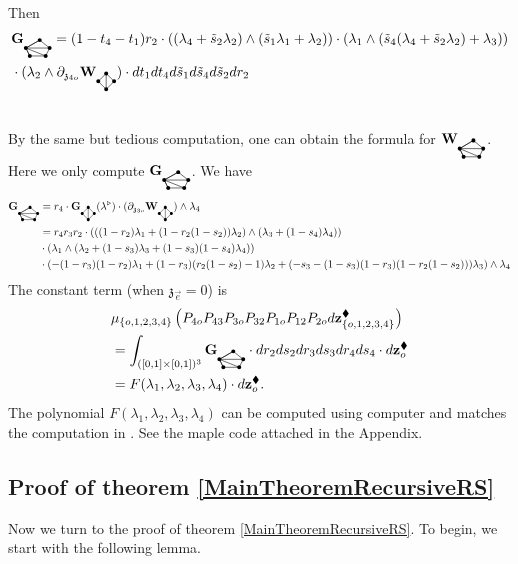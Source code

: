 \documentclass[11pt]{amsart}
\newcommand{\bgraphG}{
  \mathbf{G}_{\tikz[baseline=-0.5ex]{
      \coordinate (A) at (0,0);
      \coordinate (B) at (4mm,0);
      \coordinate (C) at (5mm,2mm);
      \coordinate (D) at (2.5mm,4mm);
      \coordinate (E) at (-1mm,2mm);

      \fill (A) circle (0.5mm);
      \fill (B) circle (0.5mm);
      \fill (C) circle (0.5mm);
      \fill (D) circle (0.5mm);
      \fill (E) circle (0.5mm);

      \draw (A) -- (B);
      \draw (B) -- (C);
      \draw (C) -- (D);
      \draw (D) -- (E);
      \draw (E) -- (A);

      \draw (E) -- (A);
      \draw (E) -- (B);
      \draw (E) -- (C);
      \draw (E) -- (D);
  }}
}
\newcommand{\bgraphW}{
  \mathbf{W}_{\tikz[baseline=-0.5ex]{
      \coordinate (A) at (0,0);
      \coordinate (B) at (4mm,0);
      \coordinate (C) at (5mm,2mm);
      \coordinate (D) at (2.5mm,4mm);
      \coordinate (E) at (-1mm,2mm);

      \fill (A) circle (0.5mm);
      \fill (B) circle (0.5mm);
      \fill (C) circle (0.5mm);
      \fill (D) circle (0.5mm);
      \fill (E) circle (0.5mm);

      \draw (A) -- (B);
      \draw (B) -- (C);
      \draw (C) -- (D);
      \draw (D) -- (E);
      \draw (E) -- (A);

      \draw (E) -- (A);
      \draw (E) -- (B);
      \draw (E) -- (C);
      \draw (E) -- (D);
  }}
}
\newcommand{\agraphG}{
  \mathbf{G}_{\tikz[baseline=-0.5ex]{
      \coordinate (A) at (0,0);
      \coordinate (B) at (4mm,0);
      \coordinate (C) at (2mm,2mm);
      \coordinate (D) at (2mm,-2mm);

      \fill (A) circle (0.5mm);
      \fill (B) circle (0.5mm);
      \fill (C) circle (0.5mm);
      \fill (D) circle (0.5mm);

      \draw (A) -- (C);
      \draw (A) -- (D);
      \draw (C) -- (D);
      \draw (B) -- (C);
      \draw (B) -- (D);
  }}
}
\newcommand{\agraphW}{
  \mathbf{W}_{\tikz[baseline=-0.5ex]{
      \coordinate (A) at (0,0);
      \coordinate (B) at (4mm,0);
      \coordinate (C) at (2mm,2mm);
      \coordinate (D) at (2mm,-2mm);

      \fill (A) circle (0.5mm);
      \fill (B) circle (0.5mm);
      \fill (C) circle (0.5mm);
      \fill (D) circle (0.5mm);

      \draw (A) -- (C);
      \draw (A) -- (D);
      \draw (C) -- (D);
      \draw (B) -- (C);
      \draw (B) -- (D);
  }}
}
\theoremstyle{definition}
\theoremstyle{remark}
\numberwithin{equation}{section}
\begin{document}
  Then
  \begin{align*}
 &\bgraphG =  (1-t_4-t_1)r_2\cdot((\lambda_4+\tilde{s}_2\lambda_2)\wedge(\tilde{s}_1\lambda_1+\lambda_2))\cdot (\lambda_1\wedge(\tilde{s}_4(\lambda_4+\tilde{s}_2\lambda_2)+\lambda_3)) \\ &\cdot  (\lambda_2\wedge \partial_{\mathfrak{z}_{4o}}\agraphW)\cdot dt_1dt_4d\tilde{s}_1d\tilde{s}_4d\tilde{s}_2dr_2 \\
     &
  \end{align*}
\fi

By the same but tedious computation, one can obtain the formula for $\bgraphW$. Here we only compute $\bgraphG$.
We have
\begin{align*}
   \bgraphG&= r_4\cdot \agraphG(\lambda^\triangleright) \cdot(\partial_{\mathfrak{z}_{3o}}\agraphW)\wedge \lambda_4  \\
   &=r_4r_3r_2\cdot \left(\left((1-r_2)\lambda_1+(1-r_2(1-s_2))\lambda_2\right)\wedge (\lambda_3+(1-s_4)\lambda_4)\right) \\
   & \cdot\left(\lambda_1\wedge\left(\lambda_2+(1-s_3)\lambda_3+(1-s_3)(1-s_4)\lambda_4\right) \right)\\ &\cdot  \left(-(1-r_3)(1-r_2)\lambda_1+(1-r_3)(r_2(1-s_2)-1)\lambda_2+(-s_3-(1-s_3)(1-r_3)(1-r_2(1-s_2)))\lambda_3\right)\wedge \lambda_4
\end{align*}
The constant term (when $\mathfrak{z}_{\vec{e}}=0$) is
    \begin{align*}
&\mu_{\{o,1,2,3,4\}}\left(P_{4o}P_{43}P_{3o}P_{32}P_{1o}P_{12}P_{2o}d\mathbf{z}^{\blacklozenge}_{\{o,1,2,3,4\}}\right)
\\
&=\int_{([0,1]\times[0,1])^3}\bgraphG\cdot dr_2ds_2dr_3ds_3dr_4ds_4\cdot d\mathbf{z}^{\blacklozenge}_o\\
&=F(\lambda_1,\lambda_2,\lambda_3,\lambda_4)\cdot d\mathbf{z}^{\blacklozenge}_o.
  \end{align*}
  The polynomial $F(\lambda_1,\lambda_2,\lambda_3,\lambda_4)$ can be computed using computer and matches the
  computation in \cite{Gaiotto:2024gii}. See the maple code attached in the Appendix.

  \subsection{Proof of theorem \ref{MainTheoremRecursiveRS}} 
  Now we turn to the proof of theorem \ref{MainTheoremRecursiveRS}. 
  To begin, we start with the following lemma.
\end{document}

